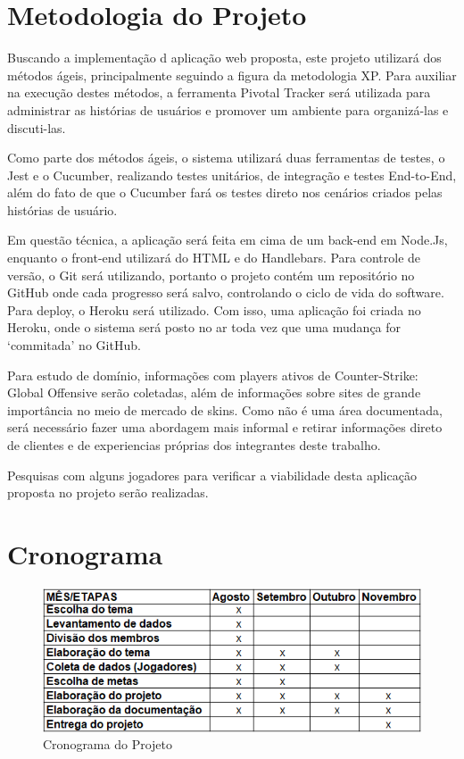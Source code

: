 \documentclass[a4paper, 12pt]{article}
\begin{document}
    \section{Metodologia do Projeto}
    Buscando a implementação d aplicação web proposta, este projeto utilizará dos métodos ágeis, principalmente seguindo a figura da metodologia XP. Para auxiliar na execução destes métodos, a ferramenta Pivotal Tracker será utilizada para administrar as histórias de usuários e promover um ambiente para organizá-las e discuti-las.
    
    Como parte dos métodos ágeis, o sistema utilizará duas ferramentas de testes, o Jest e o Cucumber, realizando testes unitários, de integração e testes End-to-End, além do fato de que o Cucumber fará os testes direto nos cenários criados pelas histórias de usuário.
    
    Em questão técnica, a aplicação será feita em cima de um back-end em Node.Js, enquanto o front-end utilizará do HTML e do Handlebars. Para controle de versão, o Git será utilizando, portanto o projeto contém um repositório no GitHub onde cada progresso será salvo, controlando o ciclo de vida do software. Para deploy, o Heroku será utilizado. Com isso, uma aplicação foi criada no Heroku, onde o sistema será posto no ar toda vez que uma mudança for ‘commitada’ no GitHub.
    
    Para estudo de domínio, informações com players ativos de Counter-Strike: Global Offensive serão coletadas, além de informações sobre sites de grande importância no meio de mercado de skins. Como não é uma área documentada, será necessário fazer uma abordagem mais informal e retirar informações direto de clientes e de experiencias próprias dos integrantes deste trabalho.
    
    Pesquisas com alguns jogadores para verificar a viabilidade desta aplicação proposta no projeto serão realizadas.

    \section{Cronograma}
    \begin{figure}[!htb]
        \centering
        \includegraphics[scale=0.6]{Imagens/Cronograma.png}
        \caption{Cronograma do Projeto}
    \end{figure}
\end{document}

